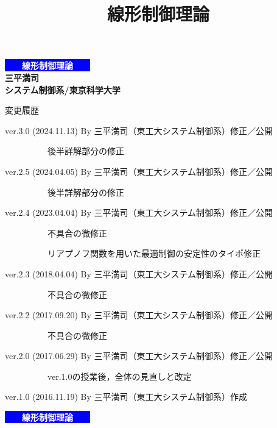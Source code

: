 \documentclass[dvipdfmx,cjk,10pt]{beamer}	%
\title[線形制御理論]
{\LARGE{線形制御理論}}
\author[Sampei (Science Tokyo) ver.3.0]{}  %
\institute[]{}
\date{}
\begin{document}

\begin{frame}[t] 



\begin{center}
\Huge \bf
\colorbox{blue}{\textcolor{white}{　　線形制御理論　　}}\\[5mm]
\Large
  三平満司\\
  システム制御系/東京科学大学
\end{center}

\hspace*{0.15\textwidth}
\begin{minipage}{0.7\textwidth}
{\footnotesize
変更履歴 %

ver.3.0 (2024.11.13) By 三平満司（東工大システム制御系）修正／公開

　　　　　後半詳解部分の修正

ver.2.5 (2024.04.05) By 三平満司（東工大システム制御系）修正／公開

　　　　　後半詳解部分の修正

ver.2.4 (2023.04.04) By 三平満司（東工大システム制御系）修正／公開

　　　　　不具合の微修正

　　　　　リアプノフ関数を用いた最適制御の安定性のタイポ修正

ver.2.3 (2018.04.04) By 三平満司（東工大システム制御系）修正／公開

　　　　　不具合の微修正

ver.2.2 (2017.09.20) By 三平満司（東工大システム制御系）修正／公開

　　　　　不具合の微修正

ver.2.0 (2017.06.29) By 三平満司（東工大システム制御系）修正／公開

　　　　　ver.1.0の授業後，全体の見直しと改定

ver.1.0 (2016.11.19) By 三平満司（東工大システム制御系）作成

}
\end{minipage}

\end{frame}

\begin{frame}[t] 


\begin{center}
\Huge \bf
\colorbox{blue}{\textcolor{white}{　　線形制御理論　　}}
\end{center}

\end{frame}
\end{document}
